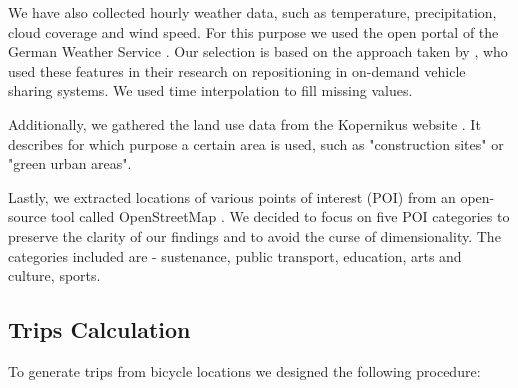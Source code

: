 We have also collected hourly weather data, such as temperature, precipitation, cloud coverage and wind speed. For this purpose we used the open portal of the German Weather Service . Our selection is based on the approach taken by , who used these features in their research on repositioning in on-demand vehicle sharing systems. We used time interpolation to fill missing values.

Additionally, we gathered the land use data from the Kopernikus website . It describes for which purpose a certain area is used, such as "construction sites" or "green urban areas".

Lastly, we extracted locations of various points of interest (POI) from an open-source tool called  OpenStreetMap . We decided to focus on five POI categories to preserve the clarity of our findings and to avoid the curse of dimensionality. The categories included are - sustenance, public transport, education, arts and culture, sports.

\subsection{Trips Calculation}
To generate trips from bicycle locations we designed the following procedure:

